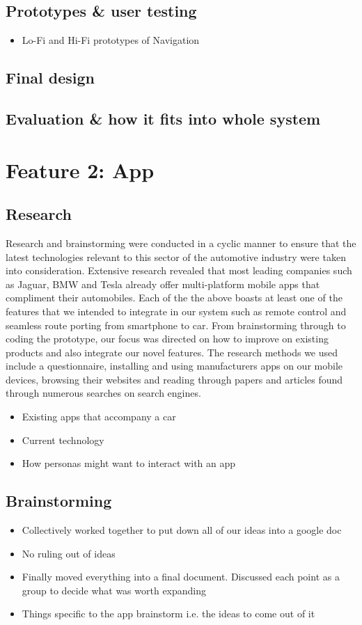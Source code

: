 \documentclass{article}
\begin{document}
\begin{itemize}
\subsection{Prototypes \& user testing}
\begin{itemize}
	\item Lo-Fi and Hi-Fi prototypes of Navigation
\end{itemize}
\subsection{Final design}
\subsection{Evaluation \& how it fits into whole system}

\section{Feature 2: App}
\subsection{Research}
Research and brainstorming were conducted in a cyclic manner to ensure that the latest technologies relevant to this sector of the automotive industry were taken into consideration. Extensive research revealed that most leading companies such as Jaguar, BMW and Tesla already offer multi-platform mobile apps that compliment their automobiles. Each of the the above boasts at least one of the features that we intended to integrate in our system such as remote control and seamless route porting from smartphone to car. From brainstorming through to coding the prototype, our focus was directed on how to improve on existing products and also integrate our novel features. 
The research methods we used include a questionnaire, installing and using manufacturers apps on our mobile devices, browsing their websites and reading through papers and articles found through numerous searches on search engines. 
	\begin{itemize}
		\item Existing apps that accompany a car
        \item Current technology
		\item How personas might want to interact with an app
	\end{itemize}
\subsection{Brainstorming}
	\begin{itemize}
		\item Collectively worked together to put down all of our ideas into a google doc
		\item No ruling out of ideas
		\item Finally moved everything into a final document. Discussed each point as a group to decide what was worth expanding
        \item Things specific to the app brainstorm i.e. the ideas to come out of it
	\end{itemize}

\end{itemize}
\end{document}
